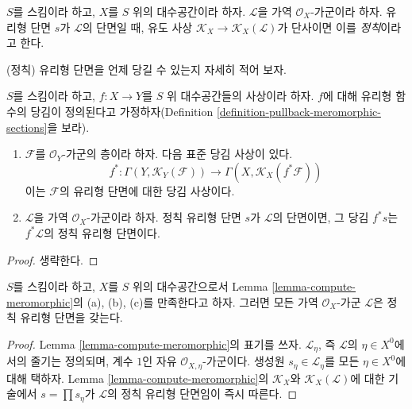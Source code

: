 \begin{definition}
\label{definition-regular-meromorphic-section}
$S$를 스킴이라 하고, $X$를 $S$ 위의 대수공간이라 하자.
$\mathcal{L}$을 가역 $\mathcal{O}_X$-가군이라 하자. 유리형 단면 $s$가
$\mathcal{L}$의 단면일 때, 유도 사상
$\mathcal{K}_X \to \mathcal{K}_X(\mathcal{L})$가 단사이면 이를
{\it 정칙}이라고 한다.
\end{definition}

\noindent
(정칙) 유리형 단면을 언제 당길 수 있는지 자세히 적어 보자.

\begin{lemma}
\label{lemma-meromorphic-sections-pullback}
$S$를 스킴이라 하고, $f : X \to Y$를 $S$ 위 대수공간들의 사상이라 하자.
$f$에 대해 유리형 함수의 당김이 정의된다고 가정하자(Definition
\ref{definition-pullback-meromorphic-sections}을 보라).
\begin{enumerate}
\item $\mathcal{F}$를 $\mathcal{O}_Y$-가군의 층이라 하자. 다음 표준 당김
사상이 있다.
$$
f^* : \Gamma(Y, \mathcal{K}_Y(\mathcal{F})) \to
\Gamma(X, \mathcal{K}_X(f^*\mathcal{F}))
$$
이는 $\mathcal{F}$의 유리형 단면에 대한 당김 사상이다.
\item $\mathcal{L}$을 가역 $\mathcal{O}_X$-가군이라 하자. 정칙 유리형
단면 $s$가 $\mathcal{L}$의 단면이면, 그 당김 $f^*s$는
$f^*\mathcal{L}$의 정칙 유리형 단면이다.
\end{enumerate}
\end{lemma}

\begin{proof}
생략한다.
\end{proof}

\begin{lemma}
\label{lemma-regular-meromorphic-section-exists}
$S$를 스킴이라 하고, $X$를 $S$ 위의 대수공간으로서 Lemma
\ref{lemma-compute-meromorphic}의 (a), (b), (c)를 만족한다고 하자.
그러면 모든 가역 $\mathcal{O}_X$-가군 $\mathcal{L}$은 정칙 유리형 단면을
갖는다.
\end{lemma}

\begin{proof}
Lemma \ref{lemma-compute-meromorphic}의 표기를 쓰자.
$\mathcal{L}_\eta$, 즉 $\mathcal{L}$의 $\eta \in X^0$에서의 줄기는
정의되며, 계수 $1$인 자유
$\mathcal{O}_{X, \eta}$-가군이다. 생성원
$s_\eta \in \mathcal{L}_\eta$를 모든 $\eta \in X^0$에 대해 택하자. Lemma
\ref{lemma-compute-meromorphic}의 $\mathcal{K}_X$와
$\mathcal{K}_X(\mathcal{L})$에 대한 기술에서
$s = \prod s_\eta$가 $\mathcal{L}$의 정칙 유리형 단면임이 즉시 따른다.
\end{proof}

